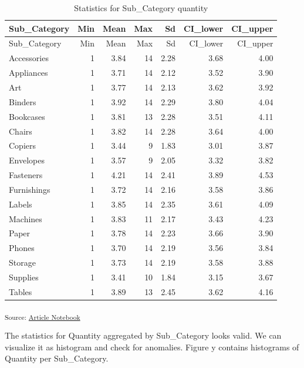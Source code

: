 \documentclass[
  letterpaper,
  DIV=11,
  numbers=noendperiod]{scrartcl}
\begin{document}
\begin{longtable}[]{@{}lrrrrrr@{}}
\caption{Statistics for Sub\_Category quantity}\tabularnewline
\toprule\noalign{}
Sub\_Category & Min & Mean & Max & Sd & CI\_lower & CI\_upper \\
\midrule\noalign{}
\endfirsthead
\toprule\noalign{}
Sub\_Category & Min & Mean & Max & Sd & CI\_lower & CI\_upper \\
\midrule\noalign{}
\endhead
\bottomrule\noalign{}
\endlastfoot
Accessories & 1 & 3.84 & 14 & 2.28 & 3.68 & 4.00 \\
Appliances & 1 & 3.71 & 14 & 2.12 & 3.52 & 3.90 \\
Art & 1 & 3.77 & 14 & 2.13 & 3.62 & 3.92 \\
Binders & 1 & 3.92 & 14 & 2.29 & 3.80 & 4.04 \\
Bookcases & 1 & 3.81 & 13 & 2.28 & 3.51 & 4.11 \\
Chairs & 1 & 3.82 & 14 & 2.28 & 3.64 & 4.00 \\
Copiers & 1 & 3.44 & 9 & 1.83 & 3.01 & 3.87 \\
Envelopes & 1 & 3.57 & 9 & 2.05 & 3.32 & 3.82 \\
Fasteners & 1 & 4.21 & 14 & 2.41 & 3.89 & 4.53 \\
Furnishings & 1 & 3.72 & 14 & 2.16 & 3.58 & 3.86 \\
Labels & 1 & 3.85 & 14 & 2.35 & 3.61 & 4.09 \\
Machines & 1 & 3.83 & 11 & 2.17 & 3.43 & 4.23 \\
Paper & 1 & 3.78 & 14 & 2.23 & 3.66 & 3.90 \\
Phones & 1 & 3.70 & 14 & 2.19 & 3.56 & 3.84 \\
Storage & 1 & 3.73 & 14 & 2.19 & 3.58 & 3.88 \\
Supplies & 1 & 3.41 & 10 & 1.84 & 3.15 & 3.67 \\
Tables & 1 & 3.89 & 13 & 2.45 & 3.62 & 4.16 \\
\end{longtable}

\textsubscript{Source:
\href{https://SJbrou.github.io/Supply_Chain_Data_Analysis/index.qmd.html}{Article
Notebook}}

The statistics for Quantity aggregated by Sub\_Category looks valid. We
can visualize it as histogram and check for anomalies. Figure y contains
histograms of Quantity per Sub\_Category.
\end{document}
